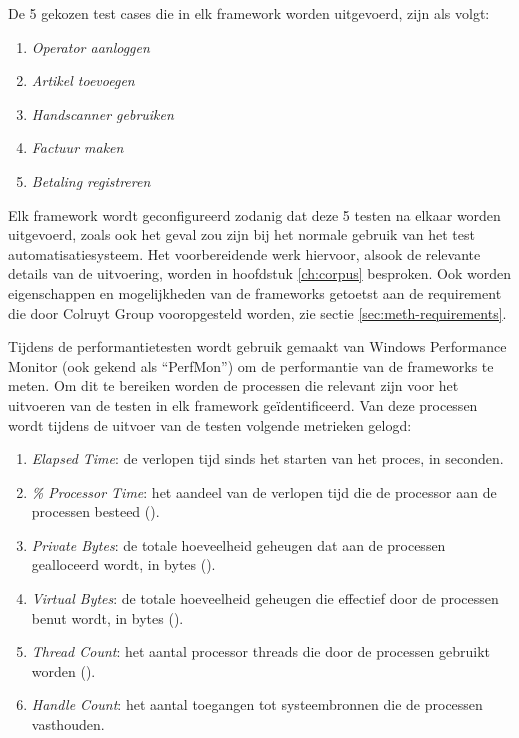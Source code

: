 De 5 gekozen test cases die in elk framework worden uitgevoerd, zijn als volgt:

\begin{enumerate}
    \item \emph{Operator aanloggen}
    \item \emph{Artikel toevoegen}
    \item \emph{Handscanner gebruiken}
    \item \emph{Factuur maken}
    \item \emph{Betaling registreren}
\end{enumerate}


Elk framework wordt geconfigureerd zodanig dat deze 5 testen na elkaar worden uitgevoerd, zoals ook het geval zou zijn bij het normale gebruik van het test automatisatiesysteem. Het voorbereidende werk hiervoor, alsook de relevante details van de uitvoering, worden in hoofdstuk \ref{ch:corpus} besproken. Ook worden eigenschappen en mogelijkheden van de frameworks getoetst aan de requirement die door Colruyt Group vooropgesteld worden, zie sectie \ref{sec:meth-requirements}.

Tijdens de performantietesten wordt gebruik gemaakt van Windows \textsuperscript{\textregistered} Performance Monitor (ook gekend als ``PerfMon'') om de performantie van de frameworks te meten. Om dit te bereiken worden de processen die relevant zijn voor het uitvoeren van de testen in elk framework geïdentificeerd. Van deze processen wordt tijdens de uitvoer van de testen volgende metrieken gelogd:

\begin{enumerate}
    \item \emph{Elapsed Time}: de verlopen tijd sinds het starten van het proces, in seconden.
    \item \emph{\% Processor Time}: het aandeel van de verlopen tijd die de processor aan de processen besteed (\cite{Tarra2014}).
    \item \emph{Private Bytes}: de totale hoeveelheid geheugen dat aan de processen gealloceerd wordt, in bytes (\cite{Hudek2017}).
    \item \emph{Virtual Bytes}: de totale hoeveelheid geheugen die effectief door de processen benut wordt, in bytes (\cite{Hudek2017}).
    \item \emph{Thread Count}: het aantal processor threads die door de processen gebruikt worden (\cite{Satran2018}).
    \item \emph{Handle Count}: het aantal toegangen tot systeembronnen die de processen vasthouden.
\end{enumerate}

